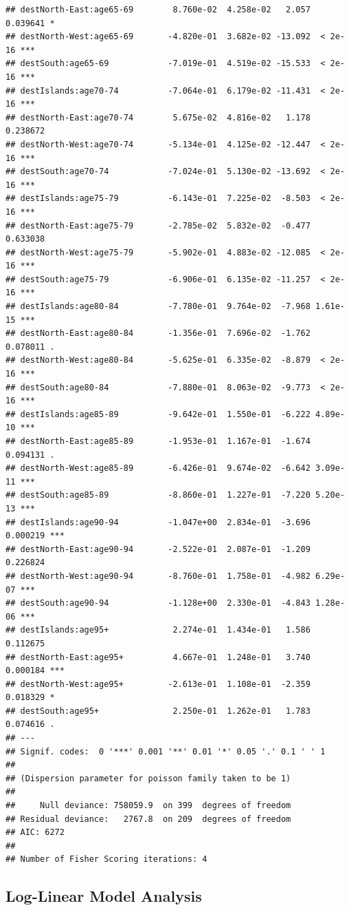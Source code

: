\documentclass[
]{book}
\begin{document}
\begin{verbatim}
## destNorth-East:age65-69        8.760e-02  4.258e-02   2.057 0.039641 *  
## destNorth-West:age65-69       -4.820e-01  3.682e-02 -13.092  < 2e-16 ***
## destSouth:age65-69            -7.019e-01  4.519e-02 -15.533  < 2e-16 ***
## destIslands:age70-74          -7.064e-01  6.179e-02 -11.431  < 2e-16 ***
## destNorth-East:age70-74        5.675e-02  4.816e-02   1.178 0.238672    
## destNorth-West:age70-74       -5.134e-01  4.125e-02 -12.447  < 2e-16 ***
## destSouth:age70-74            -7.024e-01  5.130e-02 -13.692  < 2e-16 ***
## destIslands:age75-79          -6.143e-01  7.225e-02  -8.503  < 2e-16 ***
## destNorth-East:age75-79       -2.785e-02  5.832e-02  -0.477 0.633038    
## destNorth-West:age75-79       -5.902e-01  4.883e-02 -12.085  < 2e-16 ***
## destSouth:age75-79            -6.906e-01  6.135e-02 -11.257  < 2e-16 ***
## destIslands:age80-84          -7.780e-01  9.764e-02  -7.968 1.61e-15 ***
## destNorth-East:age80-84       -1.356e-01  7.696e-02  -1.762 0.078011 .  
## destNorth-West:age80-84       -5.625e-01  6.335e-02  -8.879  < 2e-16 ***
## destSouth:age80-84            -7.880e-01  8.063e-02  -9.773  < 2e-16 ***
## destIslands:age85-89          -9.642e-01  1.550e-01  -6.222 4.89e-10 ***
## destNorth-East:age85-89       -1.953e-01  1.167e-01  -1.674 0.094131 .  
## destNorth-West:age85-89       -6.426e-01  9.674e-02  -6.642 3.09e-11 ***
## destSouth:age85-89            -8.860e-01  1.227e-01  -7.220 5.20e-13 ***
## destIslands:age90-94          -1.047e+00  2.834e-01  -3.696 0.000219 ***
## destNorth-East:age90-94       -2.522e-01  2.087e-01  -1.209 0.226824    
## destNorth-West:age90-94       -8.760e-01  1.758e-01  -4.982 6.29e-07 ***
## destSouth:age90-94            -1.128e+00  2.330e-01  -4.843 1.28e-06 ***
## destIslands:age95+             2.274e-01  1.434e-01   1.586 0.112675    
## destNorth-East:age95+          4.667e-01  1.248e-01   3.740 0.000184 ***
## destNorth-West:age95+         -2.613e-01  1.108e-01  -2.359 0.018329 *  
## destSouth:age95+               2.250e-01  1.262e-01   1.783 0.074616 .  
## ---
## Signif. codes:  0 '***' 0.001 '**' 0.01 '*' 0.05 '.' 0.1 ' ' 1
## 
## (Dispersion parameter for poisson family taken to be 1)
## 
##     Null deviance: 758059.9  on 399  degrees of freedom
## Residual deviance:   2767.8  on 209  degrees of freedom
## AIC: 6272
## 
## Number of Fisher Scoring iterations: 4
\end{verbatim}

\hypertarget{log-linear-model-analysis-4}{%
\subsection{Log-Linear Model Analysis}\label{log-linear-model-analysis-4}}
\end{document}
